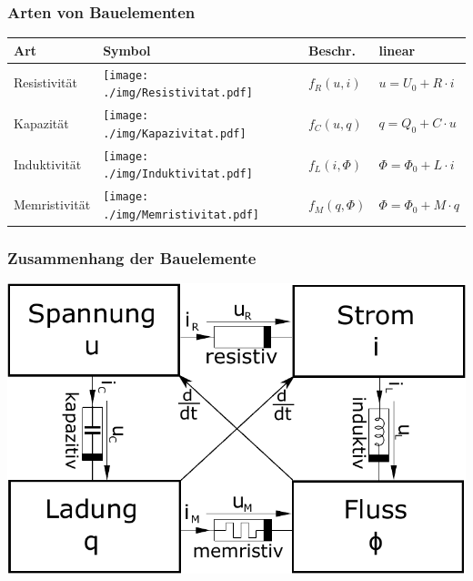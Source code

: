 \documentclass[fs, footer]{latex4ei}
\begin{document}
\begin{multicols*}{4}
    \subsubsection{Arten von Bauelementen}
    \begin{tabular}{l|l|l|l}
        Art           & Symbol                                                  & Beschr.       & linear                      \\ \hline
        Resistivität  & \texttt{[image: ./img/Resistivitat.pdf]}  & $f_R(u,i)$    & $u = U_0 + R \cdot i$       \\
        Kapazität     & \texttt{[image: ./img/Kapazivitat.pdf]}   & $f_C(u,q)$    & $q = Q_0 + C \cdot u$       \\
        Induktivität  & \texttt{[image: ./img/Induktivitat.pdf]}  & $f_L(i,\Phi)$ & $\Phi = \Phi_0 + L \cdot i$ \\
        Memristivität & \texttt{[image: ./img/Memristivitat.pdf]} & $f_M(q,\Phi)$ & $\Phi = \Phi_0 + M \cdot q$ \\
    \end{tabular}
    \subsubsection{Zusammenhang der Bauelemente}
    \begin{center}
        \includegraphics[scale=0.3]{./img/reactance_overview.pdf}
    \end{center}

\end{multicols*}
\end{document}
